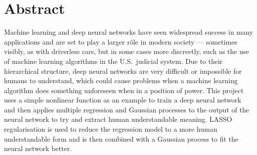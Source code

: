 
\chapter*{Abstract}

Machine learning and deep neural networks have seen widespread success in many applications and are set to play a larger r\^{o}le in modern society --- sometimes visibly, as with driverless cars, but in some cases more discreetly, such as the use of machine learning algorithms in the U.S.\ judicial system.
Due to their hierarchical structure, deep neural networks are very difficult or impossible for humans to understand, which could cause problems when a machine learning algorithm does something unforeseen when in a position of power.
This project uses a simple nonlinear function as an example to train a deep neural network and then applies multiple regression and Gaussian processes to the output of the neural network to try and extract human understandable meaning.
LASSO regularisation is used to reduce the regression model to a more human understandable form and is then combined with a Gaussian process to fit the neural network better. 
